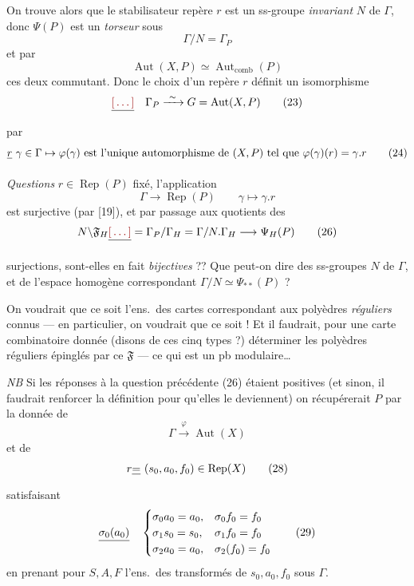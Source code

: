 \documentclass[11pt,a4paper]{article}
\begin{document}
On trouve alors que le stabilisateur  repère $r$ est un ss-groupe \emph{invariant} $N$ de $\Gamma$, donc $\Psi(P)$ est un \emph{torseur} sous
\[
\boxed{\Gamma/N = \Gamma_P} \tag{21}
\]
et par
\[
\boxed{\operatorname{Aut}(X, P) \simeq \operatorname{Aut}_{\mathrm{comb}}(P)} \tag{22}
\]
ces deux commutant. Donc le choix d'un repère $r$ définit un isomorphisme
\[
\struck{\ill{}}\quad \Gamma_P \xrightarrow{\ \sim\ } G = \operatorname{Aut}(X, P) \tag{23}
\]
par
\[
\struck{r}\ \gamma \in \Gamma \mapsto \varphi(\gamma) \text{ est l'unique automorphisme de } (X, P) \text{ tel que } \varphi(\gamma)(r) = \gamma.r \tag{24}
\]

\emph{Questions}  $r \in \operatorname{Rep}(P)$ fixé, l'application
\[
\Gamma \longrightarrow \operatorname{Rep}(P) \qquad \gamma \mapsto \gamma.r \tag{25}
\]
est surjective (par [19]), et \struck{\ill{}} par passage aux quotients des
\[
N\backslash\mathfrak{F}_H \struck{\ill{}} = \Gamma_P/\Gamma_H = \Gamma/N.\Gamma_H \longrightarrow \Psi_H(P) \tag{26}
\]

surjections, sont-elles en fait \emph{bijectives} ?? Que peut-on dire des ss-groupes  $N$ de $\Gamma$, et de l'espace homogène correspondant $\Gamma/N \simeq \Psi_{**}(P)$ ?

On voudrait que ce soit l'ens.\ des  cartes correspondant aux polyèdres \emph{réguliers} connus — en particulier, on voudrait que ce soit \emph{} ! Et il faudrait, pour une carte combinatoire donnée (disons de ces cinq types ?) déterminer les polyèdres réguliers épinglés par ce $\mathfrak{F}$ — ce qui est un pb modulaire\ldots

\emph{NB} Si les réponses à la question précédente (26) étaient positives (et sinon, il faudrait renforcer la définition pour qu'elles le deviennent) on récupérerait $P$ par la donnée de
\[
\Gamma \xrightarrow{\ \varphi\ } \operatorname{Aut}(X) \tag{27}
\]
et de
\[
r \struck{=}\ (s_0, a_0, f_0) \in \operatorname{Rep}(X) \tag{28}
\]
satisfaisant
\[
\struck{\sigma_0(a_0)}\quad
\begin{cases}
\sigma_0 a_0 = a_0, & \sigma_0 f_0 = f_0 \\
\sigma_1 s_0 = s_0, & \sigma_1 f_0 = f_0 \\
\sigma_2 a_0 = a_0, & \sigma_2(f_0) = f_0
\end{cases} \tag{29}
\]
en prenant pour $S, A, F$ l'ens.\ des transformés de $s_0, a_0, f_0$ sous $\Gamma$.
\end{document}
